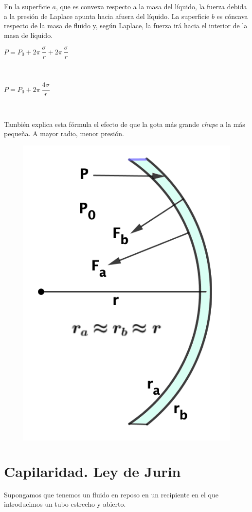 En la superficie $a$, que es convexa respecto a la masa del líquido, la fuerza debida a la presión de Laplace apunta hacia afuera del líquido. La superficie $b$ es cóncava respecto de la masa de fluido y, según Laplace, la fuerza irá hacia el interior de la masa de líquido.
\begin{multicols}{2}
$P=P_0+2\pi \ \dfrac \sigma r+2\pi \ \dfrac \sigma r$

$\quad$

$P=P_0+2\pi \ \dfrac {4\sigma} r$

$\quad$

También explica esta fórmula el efecto de que la gota más grande \emph{chupe} a la más pequeña. A mayor radio, menor presión.
\begin{figure}[H]
	\centering
	\includegraphics[width=.3\textwidth]{imagenes/imagenes08/T08IM11.png}
\end{figure}
\end{multicols}

\section{Capilaridad. Ley de Jurin}

Supongamos que tenemos un fluido en reposo en un recipiente en el que introducimos un tubo estrecho y abierto.


